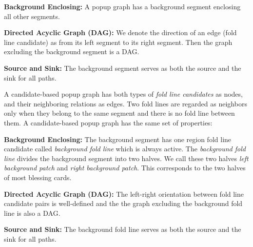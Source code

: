 \textbf{Background Enclosing: } A popup graph has a background segment enclosing all other segments.

\textbf{Directed Acyclic Graph (DAG): } We denote the direction of an edge (fold line candidate) as from its left segment to its right segment. Then the graph excluding the background segment is a DAG.

\textbf{Source and Sink: } The background segment serves as both the source and the sink for all paths.

A candidate-based popup graph has both types of \textit{fold line candidates} as nodes, and their neighboring relations as edges. Two fold lines are regarded as neighbors only when they belong to the same segment and there is no fold line between them. A candidate-based popup graph has the same set of properties:

\textbf{Background Enclosing: } The background segment has one region fold line candidate called \textit{background fold line} which is always active. The \textit{background fold line} divides the background segment into two halves. We call these two halves \textit{left background patch} and \textit{right background patch}. This corresponds to the two halves of most blessing cards.

\textbf{Directed Acyclic Graph (DAG): } The left-right orientation between fold line candidate pairs is well-defined and the the graph excluding the background fold line is also a DAG.

\textbf{Source and Sink: } The background fold line serves as both the source and the sink for all paths.






